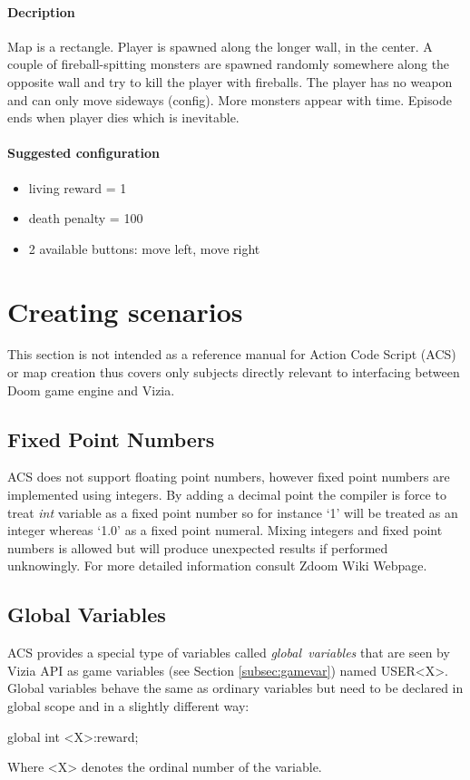 		\paragraph{Decription}
			Map is a rectangle. Player is spawned along the longer wall, in the center. A couple of fireball-spitting monsters are spawned randomly somewhere along the opposite wall and try to kill the player with fireballs. The player has no weapon and can only move sideways (config). More monsters appear with time. Episode ends when player dies which is inevitable.

		\paragraph{Suggested configuration}
		\begin{itemize}
			\item living reward = 1
			\item death penalty = 100
			\item 2 available buttons: move left, move right
		\end{itemize}
	\newpage

\section{Creating scenarios}\label{sec:creating_scenarios}
	This section is not intended as a reference manual for Action Code Script (ACS) or map creation thus covers only subjects directly relevant to interfacing between Doom game engine and Vizia.


	\subsection{Fixed Point Numbers}\label{subsec:fixed_point}
		ACS does not support floating point numbers, however fixed point numbers are implemented using integers. By adding a decimal point the compiler is force to treat \emph{int} variable as a fixed point number so for instance `1' will be treated as an integer whereas `1.0' as a fixed point numeral. Mixing integers and fixed point numbers is allowed but will produce unexpected results if performed unknowingly. For more detailed information consult Zdoom Wiki Webpage\cite{zdoom-wiki}.

	\subsection{Global Variables}\label{subsec:global_variable}
		ACS provides a special type of variables called \emph{global~variables} that are seen by Vizia API as game variables (see Section \ref{subsec:gamevar}) named USER<X>. Global variables behave the same as ordinary variables but need to be declared in global scope and in a slightly different way:
		\begin{clinee}
global int <X>:reward;
		\end{clinee}
		Where <X> denotes the ordinal number of the variable.
		

